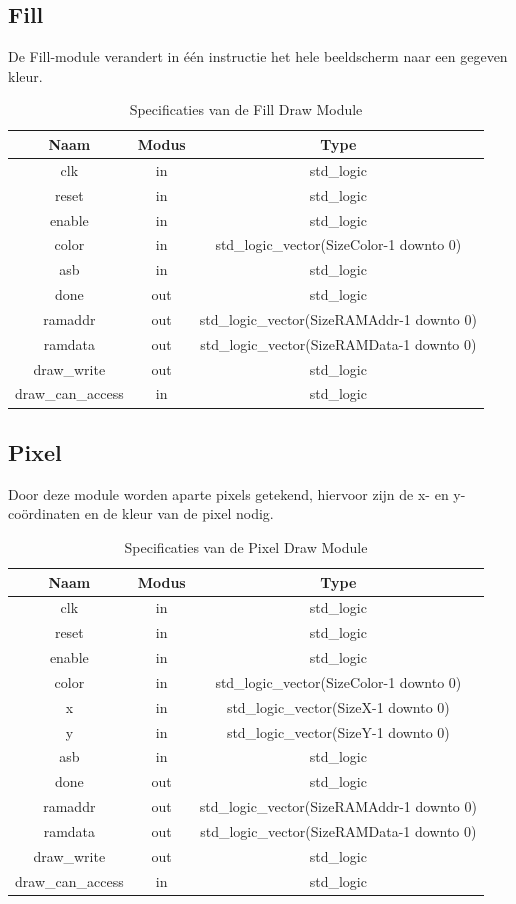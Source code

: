 \documentclass{scrreprt} %
\begin{document}
\subsection {Fill}
De Fill-module verandert in één instructie het hele beeldscherm naar een gegeven kleur.

\begin{table}[H]
\centering
\caption{Specificaties van de Fill Draw Module}
\label{tab:spec-fill-draw}
\begin{tabular}{c c c}
	\hline\hline
 	Naam & Modus & Type\\
 	\hline	
	clk & in & std\_logic \\
	reset & in & std\_logic \\
	enable& in & std\_logic \\
	color & in & std\_logic\_vector(SizeColor-1 downto 0) \\
	asb & in & std\_logic \\
	done & out & std\_logic \\
	ramaddr &out & std\_logic\_vector(SizeRAMAddr-1 downto 0) \\
	ramdata &out & std\_logic\_vector(SizeRAMData-1 downto 0) \\
	draw\_write &out & std\_logic \\
	draw\_can\_access & in & std\_logic \\
  	\hline
\end{tabular}
\end{table}

\subsection {Pixel}
Door deze module worden aparte pixels getekend, hiervoor zijn de x- en y-coördinaten en de kleur van de pixel nodig.

\begin{table}[H]
\centering
\caption{Specificaties van de Pixel Draw Module}
\label{tab:spec-pixel-draw}
\begin{tabular}{c c c}
	\hline\hline
 	Naam & Modus & Type\\
 	\hline	
	clk & in & std\_logic \\
	reset & in & std\_logic \\
	enable& in & std\_logic \\
	color & in & std\_logic\_vector(SizeColor-1 downto 0) \\
	x & in & std\_logic\_vector(SizeX-1 downto 0) \\
	y & in & std\_logic\_vector(SizeY-1 downto 0) \\
	asb & in & std\_logic \\
	done & out & std\_logic \\
	ramaddr &out & std\_logic\_vector(SizeRAMAddr-1 downto 0) \\
	ramdata &out & std\_logic\_vector(SizeRAMData-1 downto 0) \\
	draw\_write &out & std\_logic \\
	draw\_can\_access & in & std\_logic \\
  	\hline
\end{tabular}
\end{table}
\end{document}
